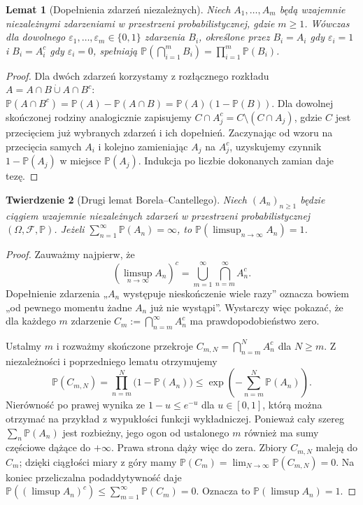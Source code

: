 \documentclass[11pt,a4paper,oneside]{report}
\numberwithin{equation}{chapter}
\theoremstyle{plain}
\newtheorem{twierdzenie}{Twierdzenie}[chapter]
\newtheorem{lemat}[twierdzenie]{Lemat}
\theoremstyle{definition}
\theoremstyle{remark}
\newcommand{\Prob}{\mathbb{P}}
\begin{document}
\begin{lemat}[Dopełnienia zdarzeń niezależnych]
Niech $A_1,\ldots,A_m$ będą wzajemnie niezależnymi
zdarzeniami w przestrzeni probabilistycznej, gdzie $m\geq1$.
Wówczas dla dowolnego $\varepsilon_1,\ldots,\varepsilon_m
\in\{0,1\}$ zdarzenia $B_i$, określone przez
$B_i=A_i$ gdy $\varepsilon_i=1$ i $B_i=A_i^c$
gdy $\varepsilon_i=0$, spełniają
$\Prob(\bigcap_{i=1}^m B_i)=\prod_{i=1}^m\Prob(B_i)$.
\end{lemat}
\begin{proof}
Dla dwóch zdarzeń korzystamy z rozłącznego rozkładu
$A=A\cap B\mathbin{\dot\cup}A\cap B^c$:
$\Prob(A\cap B^c)=\Prob(A)-\Prob(A\cap B)
=\Prob(A)(1-\Prob(B))$.
Dla dowolnej skończonej rodziny analogicznie zapisujemy
$C\cap A_j^c=C\setminus(C\cap A_j)$, gdzie $C$ jest
przecięciem już wybranych zdarzeń i ich dopełnień.
Zaczynając od wzoru na przecięcia samych $A_i$ i
kolejno zamieniając $A_j$ na $A_j^c$, uzyskujemy
czynnik $1-\Prob(A_j)$ w miejsce $\Prob(A_j)$.
Indukcja po liczbie dokonanych zamian daje tezę.
\end{proof}

\begin{twierdzenie}[Drugi lemat Borela--Cantellego]
Niech $(A_n)_{n\geq1}$ będzie ciągiem \emph{wzajemnie niezależnych}
zdarzeń w przestrzeni probabilistycznej $(\Omega,\mathcal F,\Prob)$.
Jeżeli $\sum_{n=1}^\infty\Prob(A_n)=\infty$, to
$\Prob(\limsup_{n\to\infty}A_n)=1$.
\end{twierdzenie}
\begin{proof}
Zauważmy najpierw, że
\[
(\limsup_{n\to\infty}A_n)^c
=\bigcup_{m=1}^\infty\bigcap_{n=m}^\infty A_n^c.
\]
Dopełnienie zdarzenia „$A_n$ występuje nieskończenie wiele
razy” oznacza bowiem „od pewnego momentu żadne $A_n$
już nie wystąpi”. Wystarczy więc pokazać, że dla każdego
$m$ zdarzenie $C_m:=\bigcap_{n=m}^\infty A_n^c$
ma prawdopodobieństwo zero.

Ustalmy $m$ i rozważmy skończone przekroje
$C_{m,N}=\bigcap_{n=m}^N A_n^c$ dla $N\geq m$.
Z niezależności i poprzedniego lematu otrzymujemy
\[
\Prob(C_{m,N})=\prod_{n=m}^N\bigl(1-\Prob(A_n)\bigr)
\leq \exp\!\left(-\sum_{n=m}^N\Prob(A_n)\right).
\]
Nierówność po prawej wynika ze
$1-u\leq e^{-u}$ dla $u\in[0,1]$, którą można otrzymać
na przykład z wypukłości funkcji wykładniczej.
Ponieważ cały szereg $\sum_n\Prob(A_n)$ jest rozbieżny,
jego ogon od ustalonego $m$ również ma sumy częściowe
dążące do $+\infty$. Prawa strona dąży więc do zera.
Zbiory $C_{m,N}$ maleją do $C_m$; dzięki ciągłości
miary z góry mamy
$\Prob(C_m)=\lim_{N\to\infty}\Prob(C_{m,N})=0$.
Na koniec przeliczalna podaddytywność daje
$\Prob((\limsup A_n)^c)
\leq\sum_{m=1}^\infty\Prob(C_m)=0$.
Oznacza to $\Prob(\limsup A_n)=1$.
\end{proof}
\end{document}
